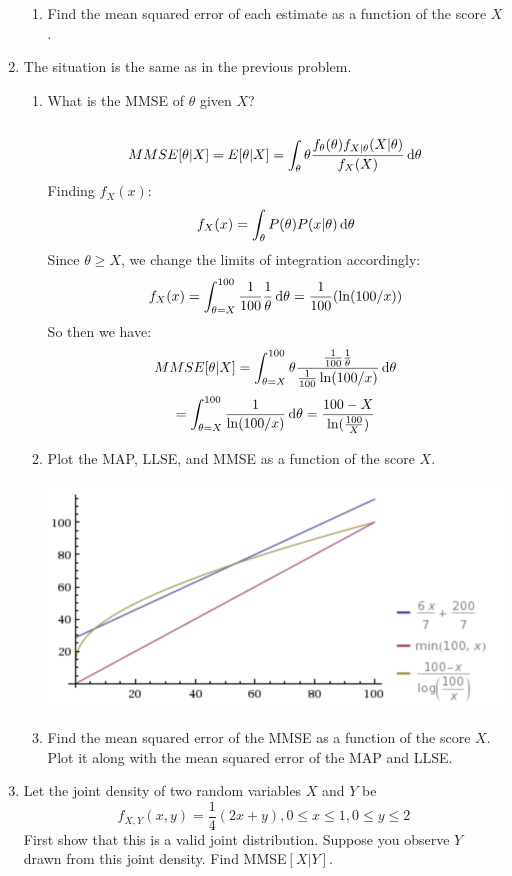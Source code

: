 \begin{enumerate}
\begin{enumerate}
      \item Find the mean squared error of each estimate as a function of the score $X$.

    \end{enumerate}
  \item The situation is the same as in the previous problem.
    \begin{enumerate}
      \item What is the MMSE of $\theta$ given $X$?\\\\

        $$MMSE[\theta|X] = E[\theta | X] = \int_{\theta} \theta \frac{f_{\theta}(\theta) f_{X|\theta}(X | \theta)}{f_{X}(X)} \operatorname{d}\!{\theta}$$
        Finding $f_X(x)$:
        $$f_X(x)= \int_{\theta} P(\theta)P(x | \theta) \operatorname{d}\!{\theta}$$
        Since $\theta \geq X$, we change the limits of integration accordingly:
        $$f_X(x) = \int_{\theta=X}^{100} \frac{1}{100} \frac{1}{\theta} \operatorname{d}\!{\theta} = \frac{1}{100}(\ln(100/x))$$
        So then we have:
        $$MMSE[\theta|X] = \int_{\theta=X}^{100} \theta \frac{\frac{1}{100}\frac{1}{\theta}}{\frac{1}{100} \ln(100/x)} \operatorname{d}\!{\theta}$$
        $$= \int_{\theta=X}^{100} \frac{1}{\ln(100/x)} \operatorname{d}\!{\theta} = \frac{100-X}{\ln(\frac{100}{X})}$$ 
      \item Plot the MAP, LLSE, and MMSE as a function of the score $X$.\\\\
        \includegraphics[width=1\textwidth]{img}
      \item Find the mean squared error of the MMSE as a function of the score $X$. Plot it along with the mean squared error of the MAP and LLSE.
        
    \end{enumerate}
  \item Let the joint density of two random variables $X$ and $Y$ be 
    $$f_{X,Y}(x,y) = \frac{1}{4}(2x+y), 0 \leq x \leq 1, 0 \leq y \leq 2$$
    First show that this is a valid joint distribution. Suppose you observe $Y$ drawn from this joint density. Find MMSE$[X|Y]$.\\\\


\end{enumerate}
